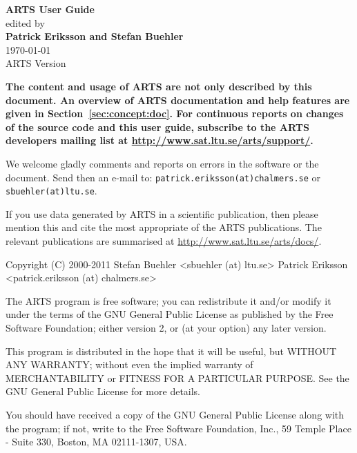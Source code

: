 \documentclass[11pt,twoside,a4paper,fleqn]{book}
\begin{document}
%
\renewcommand{\thepage}{title \arabic{page}} 

\thispagestyle{plain}
\begin{center}
  \vspace*{1cm}
  {\Huge \bf ARTS User Guide\\}
  \vspace*{1cm}
  {\large edited by \\}
  \vspace*{1cm}
  {\Large \bf Patrick Eriksson and Stefan Buehler }\\
   \vspace*{2cm}
   {\large \today\\
    ARTS Version 
   }
\end{center}
\vspace*{\fill}
{\normalsize \bf
  \noindent
  The content and usage of ARTS are not only described by this
  document. An overview of ARTS documentation and help features are
  given in Section~\ref{sec:concept:doc}. For continuous reports on
  changes of the source code and this user guide, subscribe to the
  ARTS developers mailing list at \url{http://www.sat.ltu.se/arts/support/}.

  We welcome gladly comments and reports on errors in the software or the
  document. Send then an e-mail to: \verb|patrick.eriksson(at)chalmers.se| or
  \verb|sbuehler(at)ltu.se|.

  If you use data generated by ARTS in a scientific publication, then please
  mention this and cite the most appropriate of the ARTS publications. The
  relevant publications are summarised at
  \url{http://www.sat.ltu.se/arts/docs/}. }

\newpage                          
\thispagestyle{empty}
\vspace*{\fill}
\noindent
\begin{code}
Copyright (C) 2000-2011
Stefan Buehler <sbuehler (at) ltu.se>
Patrick Eriksson <patrick.eriksson (at) chalmers.se>

The ARTS program is free software; you can redistribute it
and/or modify it under the terms of the GNU General Public
License as published by the Free Software Foundation; either
version 2, or (at your option) any later version.

This program is distributed in the hope that it will be
useful, but WITHOUT ANY WARRANTY; without even the implied
warranty of MERCHANTABILITY or FITNESS FOR A PARTICULAR
PURPOSE. See the GNU General Public License for more
details. 

You should have received a copy of the GNU General Public
License along with the program; if not, write to the Free
Software Foundation, Inc., 59 Temple Place - Suite 330,
Boston, MA 02111-1307, USA. 
\end{code}
\end{document}
